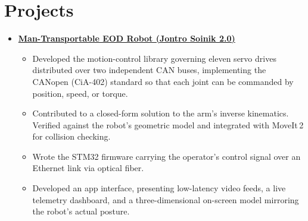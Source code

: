 \documentclass[10pt]{article}
\begin{document}
\section*{Projects}
\begin{itemize}[label={}, leftmargin=0pt, itemsep=5pt]

    \item \textbf{\href{https://youtu.be/fLiwTvl2xmI}{Man-Transportable EOD Robot
    (Jontro Soinik 2.0)}}
    \begin{itemize}
        \item Developed the motion-control library governing eleven servo drives distributed over
        two independent CAN buses, implementing the CANopen (CiA-402) standard so that each joint
        can be commanded by position, speed, or torque.
        \item Contributed to a closed-form solution to the arm's inverse kinematics. Verified
        against the robot's geometric model and integrated with MoveIt\,2 for collision checking.
        \item Wrote the STM32 firmware carrying the operator's control signal over an Ethernet
        link via optical fiber.
        \item Developed an app interface, presenting low-latency
        video feeds, a live telemetry dashboard, and a three-dimensional on-screen model mirroring
        the robot's actual posture.
    \end{itemize}


\end{itemize}
\end{document}
